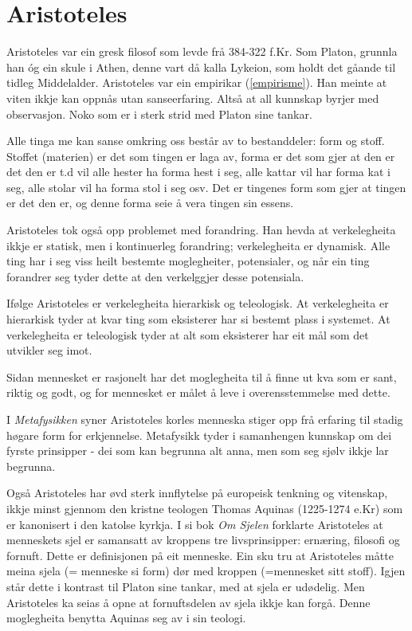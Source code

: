 \documentclass[a4paper]{IEEEtran}
\begin{document}
\section{Aristoteles}
\label{aristoteles}\bigskip

Aristoteles var ein gresk filosof som levde frå 384-322 f.Kr. Som Platon, grunnla han óg ein skule i Athen, denne vart då kalla Lykeion, som holdt det gåande til tidleg Middelalder. Aristoteles var ein empirikar (\ref{empirisme}). Han meinte at viten ikkje kan oppnås utan sanseerfaring. Altså at all kunnskap byrjer med observasjon. Noko som er i sterk strid med Platon sine tankar.\bigskip

Alle tinga me kan sanse omkring oss består av to bestanddeler: form og stoff. Stoffet (materien) er det som tingen er laga av, forma er det som gjer at den er det den er t.d vil alle hester ha forma hest i seg, alle kattar vil har forma kat i seg, alle stolar vil ha forma stol i seg osv. Det er tingenes form som gjer at tingen er det den er, og denne forma seie å vera tingen sin essens.\bigskip

Aristoteles tok også opp problemet med forandring. Han hevda at verkelegheita ikkje er statisk, men i kontinuerleg forandring; verkelegheita er dynamisk. Alle ting har i seg viss heilt bestemte moglegheiter, potensialer, og når ein ting forandrer seg tyder dette at den verkelggjer desse potensiala.\bigskip

Ifølge Aristoteles er verkelegheita hierarkisk og teleologisk. At verkelegheita er hierarkisk tyder at kvar ting som eksisterer har si bestemt plass i systemet. At verkelegheita er teleologisk tyder at alt som eksisterer har eit mål som det utvikler seg imot.\bigskip

Sidan mennesket er rasjonelt har det moglegheita til å finne ut kva som er sant, riktig og godt, og for mennesket er målet å leve i overensstemmelse med dette.\bigskip

I \textit{Metafysikken} syner Aristoteles korles menneska stiger opp frå erfaring til stadig høgare form for erkjennelse. Metafysikk tyder i samanhengen kunnskap om dei fyrste prinsipper - dei som kan begrunna alt anna, men som seg sjølv ikkje lar begrunna.\bigskip

Også Aristoteles har øvd sterk innflytelse på europeisk tenkning og vitenskap, ikkje minst gjennom den kristne teologen Thomas Aquinas (1225-1274 e.Kr) som er kanonisert i den katolse kyrkja. I si bok \textit{Om Sjelen} forklarte Aristoteles at menneskets sjel er samansatt av kroppens tre livsprinsipper: ernæring, filosofi og fornuft. Dette er definisjonen på eit menneske. Ein sku tru at Aristoteles måtte meina sjela (= menneske si form) dør med kroppen (=mennesket sitt stoff). Igjen står dette i kontrast til Platon sine tankar, med at sjela er udødelig. Men Aristoteles ka seias å opne at fornuftsdelen av sjela ikkje kan forgå. Denne moglegheita benytta Aquinas seg av i sin teologi.\bigskip
\end{document}
